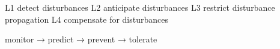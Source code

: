 L1 detect disturbances
L2 anticipate disturbances
L3 restrict disturbance propagation
L4 compensate for disturbances

monitor → predict → prevent → tolerate
